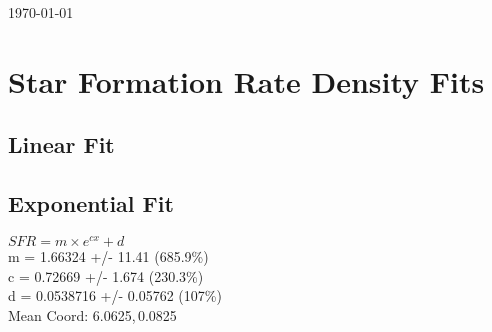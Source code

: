 \documentclass{article}
\begin{document}
\small{\today}
\section{Star Formation Rate Density Fits}
	\subsection{Linear Fit}
		\begin{minipage}[h]{0.6\textwidth}
				\begin{center}
					\begingroup{}
		  			\resizebox{\textwidth}{!}{%
						
		  			}\endgroup
				\end{center}
		\end{minipage}
		\begin{minipage}[h]{0.35\textwidth}

		\end{minipage}

	\subsection{Exponential Fit}
		\begin{minipage}[h]{0.6\textwidth}
				\begin{center}
					\begingroup{}
		  			\resizebox{\textwidth}{!}{%
						
		  			}\endgroup
				\end{center}
		\end{minipage}
		\begin{minipage}[h]{0.35\textwidth}
			$SFR = m\times e^{c x} + d$ \\
			m               = 1.66324          +/- 11.41        (685.9\%) \\
			c               = 0.72669          +/- 1.674        (230.3\%) \\
			d               = 0.0538716        +/- 0.05762      (107\%) \\

			Mean Coord: 6.0625,\,0.0825
		\end{minipage}
\end{document}
